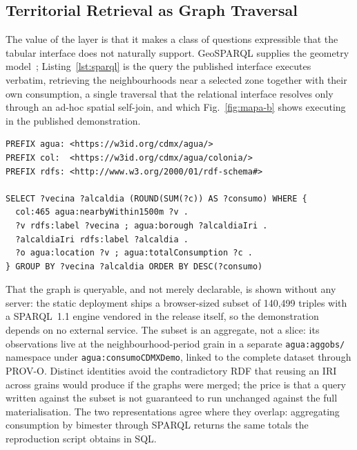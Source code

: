 \documentclass[runningheads]{llncs}
\newif\ifmarcarcambios
\newcommand{\icokg}[1]{\ifmarcarcambios\textcolor{nuevo}{#1}\else#1\fi}
\newenvironment{icokgblock}{\ifmarcarcambios\color{nuevo}\fi}{}
\renewcommand{\_}{\origunderscore\allowbreak}
\begin{document}
\begin{icokgblock}
\subsection{Territorial Retrieval as Graph Traversal}
\label{sec:sparql}

The value of the layer is that it makes a class of questions expressible that the
tabular interface does not naturally support. GeoSPARQL supplies the geometry
model~\cite{carhomburg2022}; \icokg{Listing~\ref{lst:sparql} is
the query the published interface executes verbatim}, retrieving the
neighbourhoods near a selected zone together with their own consumption, a
single traversal that the relational interface resolves only through an ad-hoc
spatial self-join, and which Fig.~\ref{fig:mapa-b} shows executing in the
published demonstration.

\begin{lstlisting}[caption={\icokg{Territorial traversal over the knowledge graph, as executed by \texttt{vecindad.html}.}},label={lst:sparql}]
PREFIX agua: <https://w3id.org/cdmx/agua/>
PREFIX col:  <https://w3id.org/cdmx/agua/colonia/>
PREFIX rdfs: <http://www.w3.org/2000/01/rdf-schema#>

SELECT ?vecina ?alcaldia (ROUND(SUM(?c)) AS ?consumo) WHERE {
  col:465 agua:nearbyWithin1500m ?v .
  ?v rdfs:label ?vecina ; agua:borough ?alcaldiaIri .
  ?alcaldiaIri rdfs:label ?alcaldia .
  ?o agua:location ?v ; agua:totalConsumption ?c .
} GROUP BY ?vecina ?alcaldia ORDER BY DESC(?consumo)
\end{lstlisting}

That the graph is queryable, and not merely declarable, is shown without any
server: the static deployment ships a browser-sized subset of \icokg{140,499} triples
with a SPARQL~1.1 engine \icokg{vendored in the release itself, so the
demonstration depends on no external service}. \icokg{The subset is an aggregate, not a slice: its observations live at the
neighbourhood-period grain in a separate \texttt{agua:aggobs/} namespace under
\texttt{agua:consumoCDMXDemo}, linked to the complete dataset through PROV-O.
Distinct identities avoid the contradictory RDF that reusing an IRI across grains
would produce if the graphs were merged; the price is that a query written
against the subset is not guaranteed to run unchanged against the full
materialisation.} The two
representations agree where they overlap: aggregating consumption by bimester
through SPARQL returns the same totals the reproduction script obtains in SQL.
\end{icokgblock}
\end{document}

